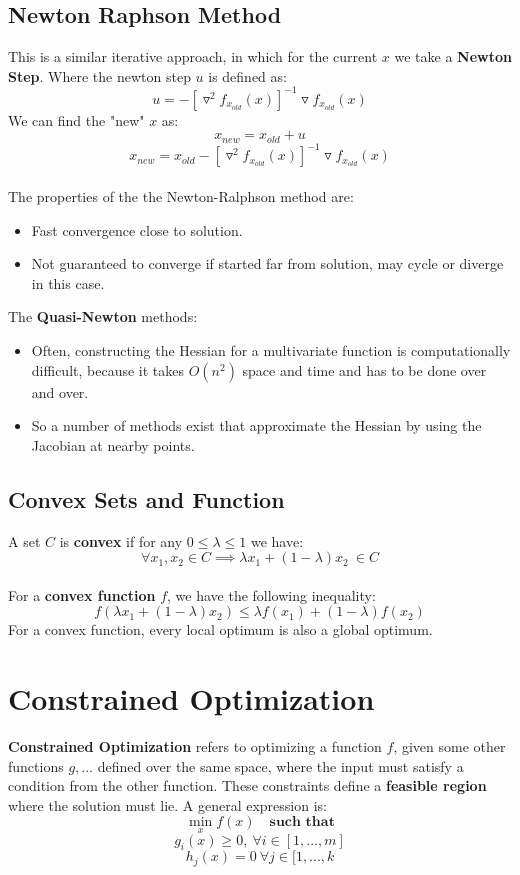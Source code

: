 \documentclass[12pt, a4paper]{book}
\begin{document}
\subsection{Newton Raphson Method}
This is a similar iterative approach, in which for the current $x$ we take a \textbf{Newton Step}. Where the newton step $u$ is defined as:
$$u = -\left[\triangledown^2 f_{x_{old}}(x) \right]^{-1}\triangledown f_{x_{old}}(x)$$
We can find the "new" $x$ as:
$$x_{new} = x_{old} + u$$
$$x_{new} = x_{old} -\left[\triangledown^2 f_{x_{old}}(x) \right]^{-1}\triangledown f_{x_{old}}(x)$$\\
The properties of the the Newton-Ralphson method are:
\begin{itemize}
    \item Fast convergence close to solution.
    \item Not guaranteed to converge if started far from solution, may cycle or diverge in this case.\\
\end{itemize}
The \textbf{Quasi-Newton} methods:
\begin{itemize}
    \item Often, constructing the Hessian for a multivariate function is computationally difficult, because it takes $O(n^2)$ space and time and has to be done over and over.
    \item So a number of methods exist that approximate the Hessian by using the Jacobian at nearby points.
\end{itemize}

\subsection{Convex Sets and Function}
A set $C$ is \textbf{convex} if for any $0 \leq \lambda \leq 1$ we have:
$$\forall x_1,x_2 \in C \implies \lambda x_1+ (1 - \lambda)x_2 \ \in C$$\\
For a \textbf{convex function} $f$, we have the following inequality:
$$f(\lambda x_1 + (1 - \lambda)x_2) \leq \lambda f(x_1) + (1-\lambda)f(x_2)$$
For a convex function, every local optimum is also a global optimum.

\section{Constrained Optimization}
\textbf{Constrained Optimization} refers to optimizing a function $f$, given some other functions $g,...$ defined over the same space, where the input must satisfy a condition from the other function. These constraints define a \textbf{feasible region} where the solution must lie. A general expression is:
$$\min_x f(x) \quad \textbf{such that}$$
$$g_i(x) \geq 0, \ \forall i \in [1,...,m]$$
$$h_j(x) = 0 \ \forall j \in [1,...,k$$
\end{document}
